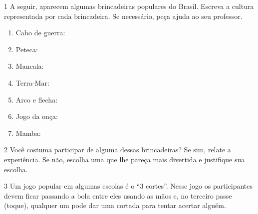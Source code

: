 
\num{1} A seguir, aparecem algumas brincadeiras populares do Brasil. Escreva a cultura representada por cada brincadeira. Se necessário, peça ajuda ao seu professor.

\begin{enumerate}
\item
  Cabo de guerra: 
\item
  Peteca: 
\item
  Mancala: 
\item
  Terra-Mar: 
\item
  Arco e flecha: 
\item
  Jogo da onça: 
\item
  Mamba: 
\end{enumerate}


\num{2} Você costuma participar de alguma dessas brincadeiras? Se sim, relate a experiência. Se não, escolha uma que lhe pareça mais divertida e justifique sua escolha.


\num{3} Um jogo popular em algumas escolas é o ``3 cortes''. Nesse jogo os
  participantes devem ficar passando a bola entre eles usando as mãos e,
  no terceiro passe (toque), qualquer um pode dar uma cortada para tentar
  acertar alguém.

